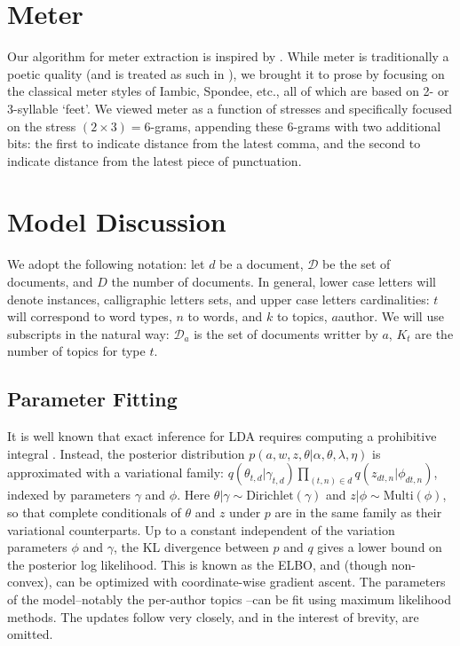 \documentclass[14pt]{article} %
\theoremstyle{plain}
\theoremstyle{definition}
\theoremstyle{remark}
\begin{document}
\begin{appendix}
\small

\section{Meter}
\label{appendix:meter}

Our algorithm for meter extraction is inspired by \citet{Genzel}. While meter is traditionally a poetic quality (and is treated as such in \citep{Genzel}), we brought it to prose by focusing on the classical meter styles of Iambic, Spondee, etc., all of which are based on 2- or 3-syllable `feet'. We viewed meter as a function of stresses and specifically focused on the stress $(2\times3)=6$-grams, appending these $6$-grams with two additional bits: the first to indicate distance from the latest comma, and the second to indicate distance from the latest piece of punctuation.

\section{Model Discussion}
\label{appendix:model}

We adopt the following notation: let $d$ be a document, $\mathcal{D}$ be the set of documents, and $D$ the number of documents. In general, lower case letters will denote instances, calligraphic letters sets, and upper case letters cardinalities: $t$ will correspond to word types, $n$ to words, and $k$ to topics, $a$author. We will use subscripts in the natural way: $\mathcal{D}_a$ is the set of documents writter by $a$, $K_t$ are the number of topics for type $t$.

\subsection{Parameter Fitting}
\label{appendix:parameter_fitting}

It is well known that exact inference for LDA requires computing a prohibitive integral \cite{Blei2003}. Instead, the posterior distribution $p(a,w,z,\theta|\alpha,\theta,\lambda,\eta)$ is approximated with a variational family: $q(\theta_{t,d}|\gamma_{t,d})\prod_{(t,n)\in d}q(z_{dt,n}|\phi_{dt,n})$, indexed by parameters $\gamma$ and $\phi$. Here $\theta|\gamma \sim\text{Dirichlet}(\gamma)$ and $z|\phi \sim\text{Multi}(\phi)$, so that complete conditionals of $\theta$ and $z$ under $p$ are in the same family as their variational counterparts. Up to a constant independent of the variation parameters $\phi$ and $\gamma$, the KL divergence between $p$ and $q$ gives a lower bound on the posterior log likelihood. This is known as the ELBO, and (though non-convex), can be optimized with coordinate-wise gradient ascent. The parameters of the model--notably the per-author topics --can be fit using maximum likelihood methods. The updates follow \cite{wang2009simultaneous} very closely, and in the interest of brevity, are omitted.


\end{appendix}
\end{document}
